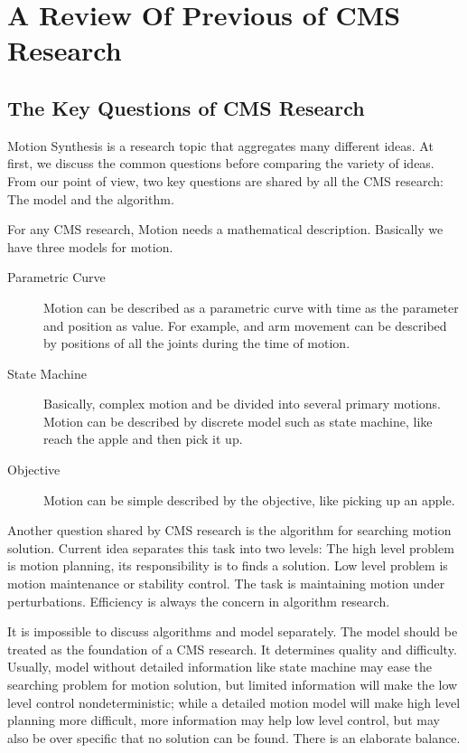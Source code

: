 \chapter{A Review Of Previous of CMS Research}
\label{chap:previouswork}

\section {The Key Questions of CMS Research}
Motion Synthesis is a research topic that aggregates many different ideas.
At first, we discuss the common questions before comparing the variety of ideas.
From our point of view, two key questions are shared by all the CMS research:
The model and the algorithm.

For any CMS research, 
Motion needs a mathematical description.
Basically we have three models for motion.
\begin{description} 
\item [Parametric Curve]
Motion can be described as a parametric curve with time as the parameter and position as value. 
For example, and arm movement can be described by positions of all the joints during the time of motion.
\item [State Machine]
Basically, complex motion and be divided into several primary motions.
Motion can be described by discrete model such as state machine, like reach the apple and then pick it up.
\item [Objective]
Motion can be simple described by the objective, like picking up an apple.
\end{description}

Another question shared by CMS research is the algorithm for searching motion solution.
Current idea separates this task into two levels:
The high level problem is motion planning, its responsibility is to finds a solution.
Low level problem is motion maintenance or stability control.
The task is maintaining motion under perturbations.
Efficiency is always the concern in algorithm research.

It is impossible to discuss algorithms and model separately.
The model should be treated as the foundation of a CMS research.
It determines quality and difficulty.
Usually, model without detailed information like state machine may ease the searching problem for motion solution, 
but limited information will make the low level control nondeterministic;
while a detailed motion  model will make high level planning more difficult, 
more information  may help low level control, but may also be over specific that no solution can be found.
There is an elaborate balance.

